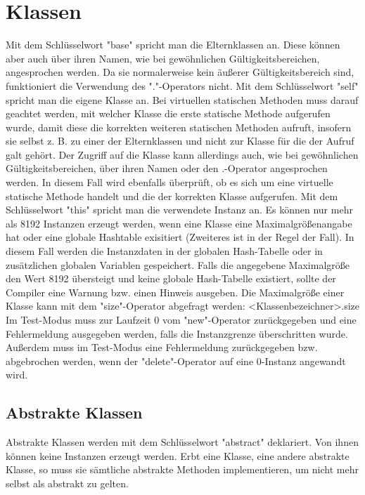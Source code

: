 \chapter{Klassen}

Mit dem Schlüsselwort "base" spricht man die Elternklassen an. Diese können aber auch über ihren Namen, wie bei gewöhnlichen
Gültigkeitsbereichen, angesprochen werden. Da sie normalerweise kein äußerer Gültigkeitsbereich sind, funktioniert die Verwendung des "."-Operators nicht.
Mit dem Schlüsselwort "self" spricht man die eigene Klasse an. Bei virtuellen statischen Methoden muss darauf geachtet werden, mit welcher Klasse
die erste statische Methode aufgerufen wurde, damit diese die korrekten weiteren statischen Methoden aufruft, insofern sie selbst z. B. zu einer
der Elternklassen und nicht zur Klasse für die der Aufruf galt gehört.
Der Zugriff auf die Klasse kann allerdings auch, wie bei gewöhnlichen Gültigkeitsbereichen, über ihren Namen oder den .-Operator angesprochen werden.
In diesem Fall wird ebenfalls überprüft, ob es sich um eine virtuelle statische Methode handelt und die der korrekten Klasse aufgerufen.
Mit dem Schlüsselwort "this" spricht man die verwendete Instanz an.
Es können nur mehr als 8192 Instanzen erzeugt werden, wenn eine Klasse eine Maximalgrößenangabe hat oder eine globale Hashtable exisitiert (Zweiteres ist in der Regel der Fall).
In diesem Fall werden die Instanzdaten in der globalen Hash-Tabelle oder in zusätzlichen globalen Variablen gespeichert.
Falls die angegebene Maximalgröße den Wert 8192 übersteigt und keine globale Hash-Tabelle existiert,
sollte der Compiler eine Warnung bzw. einen Hinweis ausgeben.
Die Maximalgröße einer Klasse kann mit dem "size"-Operator abgefragt werden: <Klassenbezeichner>.size
Im Test-Modus muss zur Laufzeit 0 vom "new"-Operator zurückgegeben und eine Fehlermeldung ausgegeben werden, falls die Instanzgrenze
überschritten wurde.
Außerdem muss im Test-Modus eine Fehlermeldung zurückgegeben bzw. abgebrochen werden, wenn der "delete"-Operator auf eine 0-Instanz angewandt wird.

\section{Abstrakte Klassen}
Abstrakte Klassen werden mit dem Schlüsselwort "abstract" deklariert. Von ihnen können keine
Instanzen erzeugt werden. Erbt eine Klasse, eine andere abstrakte Klasse, so muss sie sämtliche
abstrakte Methoden implementieren, um nicht mehr selbst als abstrakt zu gelten.

